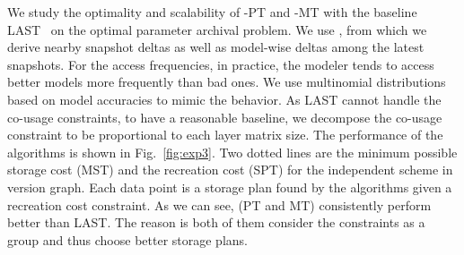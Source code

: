 \documentclass[conference]{IEEEtran}
\begin{document}



We study the optimality and scalability of \weightstore-PT and \weightstore-MT with the baseline LAST~\cite{khuller1995balancing} on the optimal parameter archival problem. We use \syntheticds\here, from which we derive nearby snapshot deltas as well as model-wise deltas among the latest snapshots.  For the access frequencies, in practice, the modeler tends to access better models more frequently than bad ones. We use  multinomial distributions based on model accuracies to mimic the behavior. 
As LAST cannot handle the co-usage constraints, to have a reasonable baseline, we decompose the co-usage constraint to be proportional to each layer matrix size. The performance of the algorithms %
is shown in Fig.~\ref{fig:exp3}. Two dotted lines are the minimum possible storage cost (MST) and the recreation cost (SPT) for the independent scheme in version graph. Each data point is a storage plan found by the algorithms given a recreation cost constraint. As we can see, \weightstore\algorithms (PT and MT) consistently perform better than LAST. The reason is both of them consider the constraints as a group and thus choose better storage plans.


\end{document}
